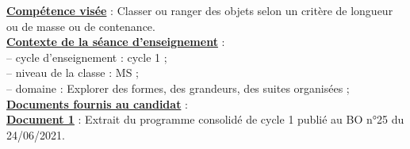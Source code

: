 {{\bf\uline{Compétence visée}} : Classer ou ranger des objets selon un critère de longueur ou de masse ou de contenance. \\

{\bf\uline{Contexte de la séance d'enseignement}} : \\
   \hspace*{5mm} -- cycle d'enseignement : cycle 1 ; \\
   \hspace*{5mm} -- niveau de la classe : MS ; \\
   \hspace*{5mm} -- domaine : Explorer des formes, des grandeurs, des suites organisées ; \\ [3mm]
  

{\bf\uline{Documents fournis au candidat}} : \\

{\bf\uline{Document 1}} : Extrait du programme consolidé de cycle 1 publié au BO n°25 du 24/06/2021. \medskip

}
